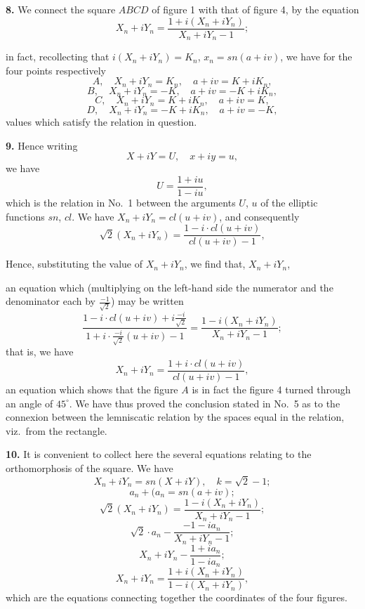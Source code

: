 \documentclass[11pt,a4paper]{article}
\begin{document}
\textbf{8.} We connect the square $ABCD$ of figure 1 with that of figure 4, by the equation
\[
X_n + iY_n = \frac{1 + i(X_n + iY_n)}{X_n + iY_n - 1};
\]

in fact, recollecting that $i (X_n + i Y_n) = K_n$, $x_n = sn (a + iv)$, we have for the four points respectively
\[
A, \quad X_n + iY_n = K_n, \quad a + iv = K + iK_n,
\]
\[
B, \quad X_n + iY_n = - K, \quad a + iv = - K + iK_n,
\]
\[
C, \quad X_n + iY_n = K + iK_n, \quad a + iv = K,
\]
\[
D, \quad X_n + iY_n = - K + iK_n, \quad a + iv = - K,
\]
values which satisfy the relation in question.

\textbf{9.} Hence writing
\[
X + iY = U, \quad x + iy = u,
\]
we have
\[
U = \frac{1 + iu}{1 - iu},
\]
which is the relation in No.\ 1 between the arguments $U$, $u$ of the elliptic functions $sn$, $cl$. We have $X_n + iY_n = cl (u + iv)$, and consequently
\[
\sqrt{2}(X_n + iY_n) = \frac{1 - i \cdot cl (u + iv)}{cl (u + iv) - 1},
\]

Hence, substituting the value of $X_n + iY_n$, we find that, $X_n + iY_n$,

an equation which (multiplying on the left-hand side the numerator and the denominator each by $\frac{- 1}{\sqrt{2}}$) may be written
\[
\frac{1 - i \cdot cl (u + iv) + i \frac{- i}{\sqrt{2}}}{1 + i \cdot \frac{- i}{\sqrt{2}}(u + iv) - 1} = \frac{1 - i(X_n + iY_n)}{X_n + iY_n - 1};
\]
that is, we have
\[
X_n + iY_n = \frac{1 + i \cdot cl (u + iv)}{cl (u + iv) - 1},
\]
an equation which shows that the figure $A$ is in fact the figure 4 turned through an angle of $45^\circ$. We have thus proved the conclusion stated in No.\ 5 as to the connexion between the lemniscatic relation by the spaces equal in the relation, viz.\ from the rectangle.

\textbf{10.} It is convenient to collect here the several equations relating to the orthomorphosis of the square. We have
\[
X_n + iY_n = sn (X + iY), \quad k = \sqrt{2} - 1;
\]
\[
a_n + (a_n = sn(a + iv);
\]
\[
\sqrt{2}(X_n + iY_n) = \frac{1 - i(X_n + iY_n)}{X_n + iY_n - 1};
\]
\[
\sqrt{2} \cdot a_n - \frac{- 1 - i a_n}{X_n + iY_n - 1};
\]
\[
X_n + iY_n - \frac{1 + ia_n}{1 - ia_n};
\]
\[
X_n + iY_n = \frac{1 + i(X_n + iY_n)}{1 - i(X_n + iY_n)},
\]
which are the equations connecting together the coordinates of the four figures.
\end{document}
